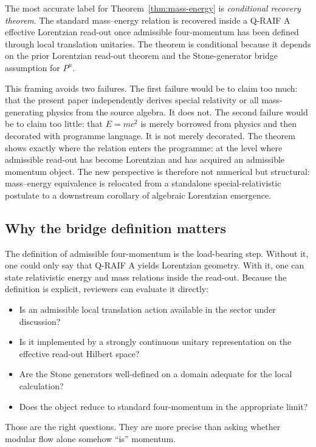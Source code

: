 \documentclass[12pt,a4paper]{article}
\theoremstyle{definition}
\theoremstyle{remark}
\newcommand{\tightlist}{%
  \setlength{\itemsep}{0pt}\setlength{\parskip}{0pt}}
\begin{document}
The most accurate label for Theorem~\ref{thm:mass-energy} is \emph{conditional recovery theorem}. The standard mass--energy relation is recovered inside a Q-RAIF A effective Lorentzian read-out once admissible four-momentum has been defined through local translation unitaries. The theorem is conditional because it depends on the prior Lorentzian read-out theorem and the Stone-generator bridge assumption for $P^\mu$.

This framing avoids two failures. The first failure would be to claim too much: that the present paper independently derives special relativity or all mass-generating physics from the source algebra. It does not. The second failure would be to claim too little: that $E=mc^2$ is merely borrowed from physics and then decorated with programme language. It is not merely decorated. The theorem shows exactly where the relation enters the programme: at the level where admissible read-out has become Lorentzian and has acquired an admissible momentum object. The new perspective is therefore not numerical but structural: mass--energy equivalence is relocated from a standalone special-relativistic postulate to a downstream corollary of algebraic Lorentzian emergence.

\subsection{Why the bridge definition matters}

The definition of admissible four-momentum is the load-bearing step. Without it, one could only say that Q-RAIF A yields Lorentzian geometry. With it, one can state relativistic energy and mass relations inside the read-out. Because the definition is explicit, reviewers can evaluate it directly:

\begin{itemize}[leftmargin=*]
\tightlist
\item Is an admissible local translation action available in the sector under discussion?
\item Is it implemented by a strongly continuous unitary representation on the effective read-out Hilbert space?
\item Are the Stone generators well-defined on a domain adequate for the local calculation?
\item Does the object reduce to standard four-momentum in the appropriate limit?
\end{itemize}

Those are the right questions. They are more precise than asking whether modular flow alone somehow ``is'' momentum.
\end{document}
